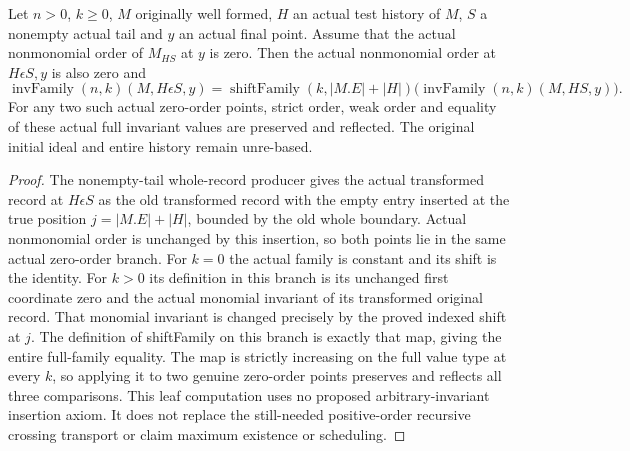 \begin{theorem}
\label{hir:original-interior-empty-full-family-monomial-leaf}
\leanok
{}
Let $n>0$, $k\geq0$, $M$ originally well formed, $H$ an actual test
history of $M$, $S$ a nonempty actual tail and $y$ an actual final point.
Assume that the actual nonmonomial order of $M_{HS}$ at $y$ is zero.
Then the actual nonmonomial order at $H\epsilon S,y$ is also zero and
\[
 \operatorname{invFamily}(n,k)(M,H\epsilon S,y)
 =\operatorname{shiftFamily}(k,|M.E|+|H|)
    \bigl(\operatorname{invFamily}(n,k)(M,HS,y)\bigr).
\]
For any two such actual zero-order points, strict order, weak order and
equality of these actual full invariant values are preserved and reflected.
The original initial ideal and entire history remain unre-based.
\end{theorem}
\begin{proof}
The nonempty-tail whole-record producer gives the actual transformed
record at $H\epsilon S$ as the old transformed record with the empty
entry inserted at the true position $j=|M.E|+|H|$, bounded by the old
whole boundary.  Actual nonmonomial order is unchanged by this insertion,
so both points lie in the same actual zero-order branch.  For $k=0$ the
actual family is constant and its shift is the identity.  For $k>0$ its
definition in this branch is its unchanged first coordinate zero and the
actual monomial invariant of its transformed original record.  That
monomial invariant is changed precisely by the proved indexed shift at
$j$.  The definition of shiftFamily on this branch is exactly that map,
giving the entire full-family equality.  The map is strictly increasing
on the full value type at every $k$, so applying it to two genuine
zero-order points preserves and reflects all three comparisons.  This
leaf computation uses no proposed arbitrary-invariant insertion axiom.
It does not replace the still-needed positive-order recursive crossing
transport or claim maximum existence or scheduling.
\end{proof}
